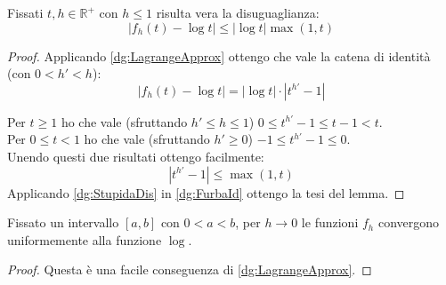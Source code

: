 \begin{lemma}\label{dg:DisEstremale}
	Fissati $t,h\in\mathbb{R^+}$ con $h\le1$ risulta vera la disuguaglianza:
	\begin{equation*}
		\left\lvert f_h(t)-\log{t}\right\rvert\le \left\lvert\log{t}\right\rvert\max(1,t)
	\end{equation*}
\end{lemma}
\begin{proof}
	Applicando \cref{dg:LagrangeApprox} ottengo che vale la catena di identità (con $0<h'<h$):
	\begin{equation}\label{dg:FurbaId}
		\left\lvert f_h(t)-\log{t}\right\rvert=\left\lvert\log{t}\right\rvert \cdot \left\lvert t^{h'}-1\right\rvert
	\end{equation}
	
	Per $t\ge 1$ ho che vale (sfruttando $h'\le h\le 1$) $0\le t^{h'}-1\le t-1<t$.\\
	Per $0\le t<1$ ho che vale (sfruttando $h'\ge0$) $-1\le t^{h'}-1\le 0$.\\
	Unendo questi due risultati ottengo facilmente:
	\begin{equation}\label{dg:StupidaDis}
		\left\lvert t^{h'}-1\right\rvert \le \max(1,t)
	\end{equation}
	Applicando \cref{dg:StupidaDis} in \cref{dg:FurbaId} ottengo la tesi del lemma.
\end{proof}

\begin{lemma}\label{dg:UnifConv}
	Fissato un intervallo $[a,b]$ con $0<a<b$, per $h\to 0$ le funzioni $f_h$ convergono uniformemente alla funzione $\log$.
\end{lemma}
\begin{proof}
	Questa è una facile conseguenza di \cref{dg:LagrangeApprox}.
\end{proof}

